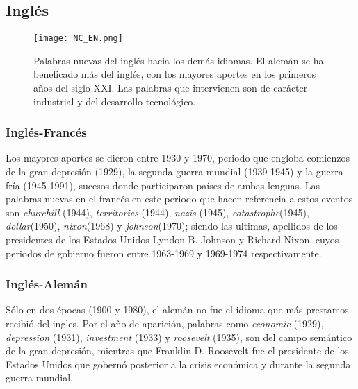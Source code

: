 
\subsection{Inglés} %

\begin{figure} %
	\centering
	\texttt{[image: NC\_EN.png]}
	\label{fig.NC_EN}
	\caption{Palabras nuevas del inglés hacia los demás idiomas. El alemán se ha beneficado más del inglés, con los mayores aportes en los primeros años del siglo XXI. Las palabras que intervienen son de carácter industrial y del desarrollo tecnológico.}
\end{figure} %


\subsubsection*{Inglés-Francés} %

Los mayores aportes se dieron entre 1930 y 1970, periodo que engloba comienzos de
la gran depresión (1929), la segunda guerra mundial (1939-1945) y la guerra fría (1945-1991), sucesos donde participaron países de ambas lenguas. Las palabras nuevas en el francés en este periodo que hacen referencia a estos eventos son \textit{churchill} (1944), \textit{territories} (1944), \textit{nazis} (1945), \textit{catastrophe}(1945), \textit{dollar}(1950), \textit{nixon}(1968) y \textit{johnson}(1970); siendo las ultimas,  apellidos de los presidentes de los Estados Unidos  Lyndon B. Johnson y Richard Nixon, cuyos periodos de gobierno fueron  entre 1963-1969 y 1969-1974 respectivamente.

\subsubsection*{Inglés-Alemán} %

Sólo  en dos épocas (1900  y 1980), el alemán no fue el idioma que más prestamos recibió  del ingles. Por el año de aparición, palabras como \textit{economic} (1929), \textit{depression} (1931), \textit{investment} (1933) y \textit{roosevelt} (1935), son del campo semántico de la gran depresión,  mientras que  Franklin D. Roosevelt fue el presidente de los Estados Unidos que gobernó posterior a la crisis económica y durante la segunda guerra mundial. 

